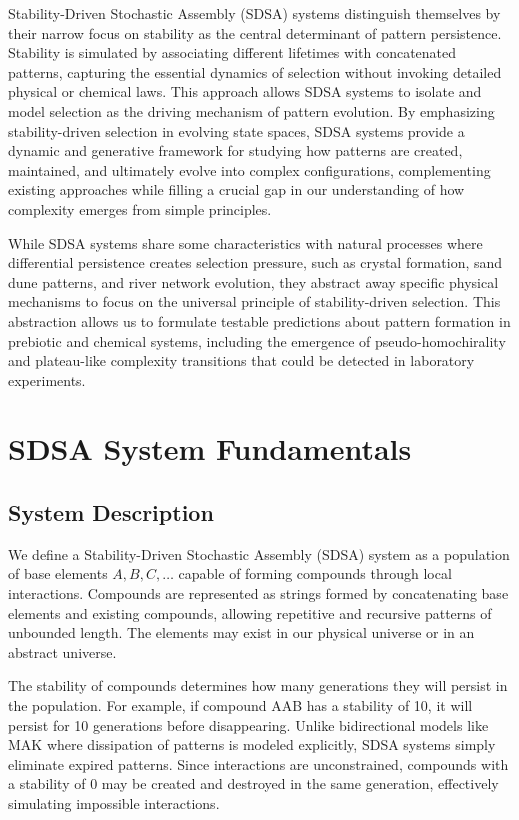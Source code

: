 \documentclass[preprint,12pt]{elsarticle}
\begin{document}
Stability-Driven Stochastic Assembly (SDSA) systems distinguish themselves by their narrow focus on stability as the central determinant of pattern persistence. Stability is simulated by associating different lifetimes with concatenated patterns, capturing the essential dynamics of selection without invoking detailed physical or chemical laws. This approach allows SDSA systems to isolate and model selection as the driving mechanism of pattern evolution. By emphasizing stability-driven selection in evolving state spaces, SDSA systems provide a dynamic and generative framework for studying how patterns are created, maintained, and ultimately evolve into complex configurations, complementing existing approaches while filling a crucial gap in our understanding of how complexity emerges from simple principles.

While SDSA systems share some characteristics with natural processes where differential persistence creates selection pressure, such as crystal formation, sand dune patterns, and river network evolution, they abstract away specific physical mechanisms to focus on the universal principle of stability-driven selection. This abstraction allows us to formulate testable predictions about pattern formation in prebiotic and chemical systems, including the emergence of pseudo-homochirality and plateau-like complexity transitions that could be detected in laboratory experiments.

\section{SDSA System Fundamentals}

\subsection{System Description}

We define a Stability-Driven Stochastic Assembly (SDSA) system as a population of base elements \( A, B, C, \dots \) capable of forming compounds through local interactions. Compounds are represented as strings formed by concatenating base elements and existing compounds, allowing repetitive and recursive patterns of unbounded length. The elements may exist in our physical universe or in an abstract universe. 

The stability of compounds determines how many generations they will persist in the population. For example, if compound AAB has a stability of 10, it will persist for 10 generations before disappearing. Unlike bidirectional models like MAK where dissipation of patterns is modeled explicitly, SDSA systems simply eliminate expired patterns. Since interactions are unconstrained, compounds with a stability of 0 may be created and destroyed in the same generation, effectively simulating impossible interactions. 
\end{document}
